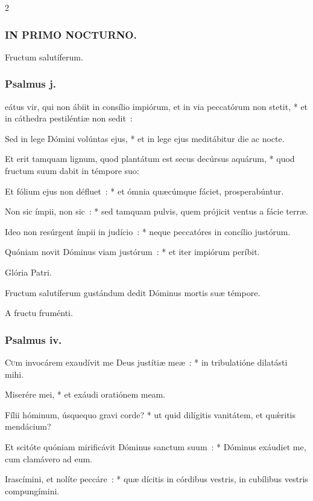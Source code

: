 \documentclass[9pt,twoside]{extarticle}
\begin{document}
\begin{multicols}{2}
\subsubsection*{\center \textsc{IN PRIMO NOCTURNO.}}
 Fructum salutíferum.
\subsubsection*{\center Psalmus j.}
eátus vir, qui non ábiit in consílio impiórum, et in via peccatórum non stetit, * et in cáthedra pestiléntiæ non sedit~:

Sed in lege Dómini volúntas ejus, * et in lege ejus meditábitur die ac nocte.

Et erit tamquam lignum, quod plantátum est secus decúrsus aquárum, * quod fructum suum dabit in témpore suo:

Et fólium ejus non défluet~: * et ómnia quæcúmque fáciet, prosperabúntur.

Non sic ímpii, non sic~: * sed tamquam pulvis, quem prójicit ventus a fácie terræ.

Ideo non resúrgent ímpii in judício~: * neque peccatóres in concílio justórum.

Quóniam novit Dóminus viam justórum~: * et iter impiórum períbit.

Glória Patri.

\begin{tightlist}{}
\item {} Fructum salutíferum gustándum dedit Dóminus mortis suæ témpore.
\item {} A fructu fruménti.
\end{tightlist}

\subsubsection*{\center Psalmus iv.}
\lettrine{C}um invocárem exaudívit me Deus justítiæ meæ~: * in tribulatióne dilatásti mihi.

Miserére mei, * et exáudi oratiónem meam.

Fílii hóminum, úsquequo gravi corde? * ut quid dilígitis vanitátem, et quǽritis mendácium?

Et scitóte quóniam mirificávit Dóminus sanctum suum~: * Dóminus exáudiet me, cum clamávero ad eum.

Irascímini, et nolíte peccáre~: * quæ dícitis in córdibus vestris, in cubílibus vestris compungímini.


\end{multicols}
\end{document}
